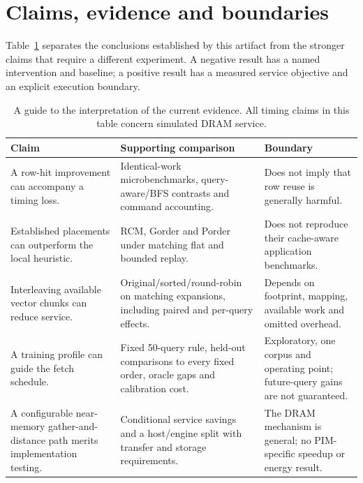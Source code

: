 \section{Claims, evidence and boundaries}
\label{sec:claim-scope}
Table~\ref{tab:claim-scope} separates the conclusions established by this artifact from the stronger claims that require a different experiment. A negative result has a named intervention and baseline; a positive result has a measured service objective and an explicit execution boundary.

\begin{table}[htbp]\centering\small
\caption[What each result establishes]{A guide to the interpretation of the current evidence. All timing claims in this table concern simulated DRAM service.}\label{tab:claim-scope}
\begin{tabular}{>{\raggedright\arraybackslash}p{}>{\raggedright\arraybackslash}p{}>{\raggedright\arraybackslash}p{}}
\toprule
Claim & Supporting comparison & Boundary\\\midrule
A row-hit improvement can accompany a timing loss. & Identical-work microbenchmarks, query-aware/BFS contrasts and command accounting. & Does not imply that row reuse is generally harmful.\\
Established placements can outperform the local heuristic. & RCM, Gorder and Porder under matching flat and bounded replay. & Does not reproduce their cache-aware application benchmarks.\\
Interleaving available vector chunks can reduce service. & Original/sorted/round-robin on matching expansions, including paired and per-query effects. & Depends on footprint, mapping, available work and omitted overhead.\\
A training profile can guide the fetch schedule. & Fixed 50-query rule, held-out comparisons to every fixed order, oracle gaps and calibration cost. & Exploratory, one corpus and operating point; future-query gains are not guaranteed.\\
A configurable near-memory gather-and-distance path merits implementation testing. & Conditional service savings and a host/engine split with transfer and storage requirements. & The DRAM mechanism is general; no PIM-specific speedup or energy result.\\\bottomrule
\end{tabular}
\end{table}
